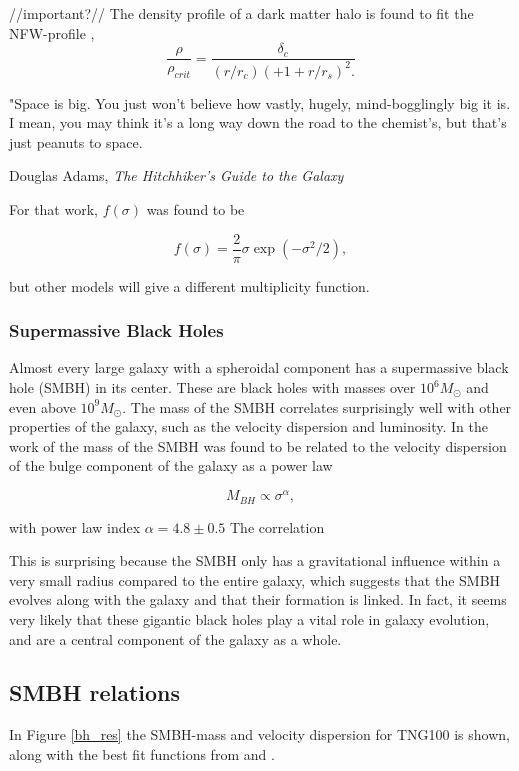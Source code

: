 //important?//
The density profile of a dark matter halo is found to fit the NFW-profile \parencite{Navarro1996},
\begin{equation}
    \frac{\rho}{\rho_{crit}} = \frac{\delta_c}{(r/r_c)(+1+r/r_s)^2.}
\end{equation}

\epigraph{"Space is big. You just won't believe how vastly, hugely, mind-bogglingly big it is. I mean, you may think it's a long way down the road to the chemist's, but that's just peanuts to space.}{Douglas Adams, \textit{The Hitchhiker's Guide to the Galaxy}}

For that work, $f(\sigma)$ was found to be

\begin{equation}
    f(\sigma) = \frac{2}{\pi} \sigma \exp(-\sigma^2/2),
\end{equation}

but other models will give a different multiplicity function.

\subsubsection{Supermassive Black Holes}
Almost every large galaxy with a spheroidal component has a supermassive black hole (SMBH) in its center. These are black holes with masses over $10^6 M_{\odot}$ and even above $10^9 M_{\odot}$. The mass of the SMBH correlates surprisingly well with other properties of the galaxy, such as the velocity dispersion and luminosity. In the work of \cite{Ferrarese2000} the mass of the SMBH was found to be related to the velocity dispersion of the bulge component of the galaxy as a power law


\begin{equation}
    M_{BH} \propto \sigma^{\alpha},
\end{equation}

with power law index $\alpha = 4.8 \pm 0.5$ The correlation 

This is surprising because the SMBH only has a gravitational influence within a very small radius compared to the entire galaxy, which suggests that the SMBH evolves along with the galaxy and that their formation is linked. In fact, it seems very likely that these gigantic black holes play a vital role in galaxy evolution, and are a central component of the galaxy as a whole.


\subsection{SMBH relations}
In Figure \ref{bh_res} the SMBH-mass and velocity dispersion for TNG100 is shown, along with the best fit functions from \cite{Ferrarese2000} and \cite{Tundo2007}.

